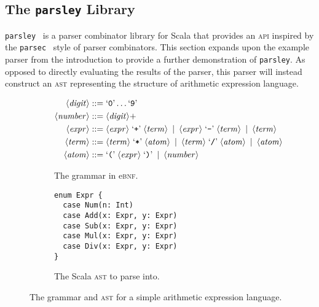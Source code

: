\documentclass[../../main.tex]{subfiles}
\begin{document}
\subsection{The \texttt{parsley} Library}
\texttt{parsley}~\cite{willis_garnishing_2018} is a parser combinator library for Scala that provides an \textsc{api} inspired by the \texttt{parsec}~\cite{leijen_parsec_2001} style of parser combinators.
This section expands upon the example parser from the introduction to provide a further demonstration of \texttt{parsley}.
As opposed to directly evaluating the results of the parser, this parser will instead construct an \textsc{ast} representing the structure of arithmetic expression language.

\begin{figure}[htbp]
\centering
\begin{subfigure}{0.575\textwidth}
\vspace{3ex}
\centering
\begin{align*}
\langle \mathit{digit} \rangle &::= \text{`\texttt{0}'} \ldots \text{`\texttt{9}'} \\
\langle \mathit{number} \rangle &::= \langle \mathit{digit} \rangle+ \\
\langle \mathit{expr} \rangle &::= \langle \mathit{expr} \rangle \; \text{`\texttt{+}'} \; \langle \mathit{term} \rangle \enspace | \enspace
                                \langle \mathit{expr} \rangle \; \text{`\texttt{-}'} \; \langle \mathit{term} \rangle \enspace | \enspace
                                \langle \mathit{term} \rangle \\
\langle \mathit{term} \rangle &::= \langle \mathit{term} \rangle \; \text{`\texttt{*}'} \; \langle \mathit{atom} \rangle \enspace | \enspace
                                \langle \mathit{term} \rangle \; \text{`\texttt{/}'} \; \langle \mathit{atom} \rangle \enspace | \enspace
                                \langle \mathit{atom} \rangle \\
\langle \mathit{atom} \rangle &::= \text{`\texttt{(}'} \; \langle \mathit{expr} \rangle \; \text{`\texttt{)}'} \enspace | \enspace
                                \langle \mathit{number} \rangle
\end{align*}
\caption{The grammar in e\textsc{bnf}.}
\label{fig:simple-grammar-ebnf}
\end{subfigure}
\hfill
\begin{subfigure}{0.325\textwidth}
\vspace{5ex}
\centering
\begin{verbatim}
enum Expr {
  case Num(n: Int)
  case Add(x: Expr, y: Expr)
  case Sub(x: Expr, y: Expr)
  case Mul(x: Expr, y: Expr)
  case Div(x: Expr, y: Expr)
}
\end{verbatim}
\caption{The Scala \textsc{ast} to parse into.}
\label{fig:simple-grammar-ast}
\end{subfigure}
\caption{The grammar and \textsc{ast} for a simple arithmetic expression language.}
\end{figure}
\end{document}
